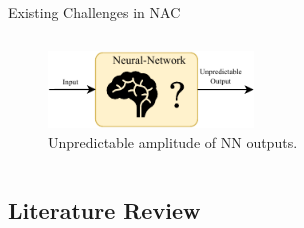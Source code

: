 \documentclass[8pt, aspectratio=169, handout]{beamer}
\begin{document}
\begin{frame}{\insertsubsectionhead}{Existing Challenges in NAC}
\begin{enumerate}
\begin{columns}[T,onlytextwidth]
          \centering
          \begin{figure}
            \includegraphics[width=0.8\textwidth]{figures/unpredictable.drawio.pdf}
            \caption{Unpredictable amplitude of NN outputs.}
          \end{figure}
      \end{columns}
  \end{enumerate}

\end{frame}

\subsection{Literature Review}
\end{document}
